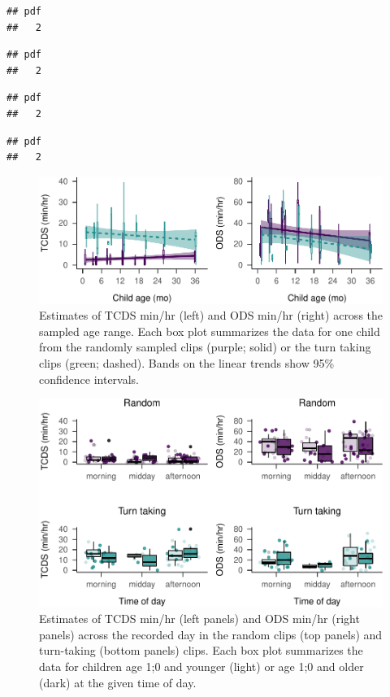 \documentclass[,man,floatsintext]{apa6}
\begin{document}
\begin{verbatim}
## pdf 
##   2
\end{verbatim}

\begin{verbatim}
## pdf 
##   2
\end{verbatim}

\begin{verbatim}
## pdf 
##   2
\end{verbatim}

\begin{verbatim}
## pdf 
##   2
\end{verbatim}

\begin{figure}
\centering
\includegraphics{Yeli-CLE_files/figure-latex/fig3-1.pdf}
\caption{\label{fig:fig3}Estimates of TCDS min/hr (left) and ODS min/hr
(right) across the sampled age range. Each box plot summarizes the data
for one child from the randomly sampled clips (purple; solid) or the
turn taking clips (green; dashed). Bands on the linear trends show 95\%
confidence intervals.}
\end{figure}

\begin{figure}
\centering
\includegraphics{Yeli-CLE_files/figure-latex/fig4-1.pdf}
\caption{\label{fig:fig4}Estimates of TCDS min/hr (left panels) and ODS
min/hr (right panels) across the recorded day in the random clips (top
panels) and turn-taking (bottom panels) clips. Each box plot summarizes
the data for children age 1;0 and younger (light) or age 1;0 and older
(dark) at the given time of day.}
\end{figure}
\end{document}
